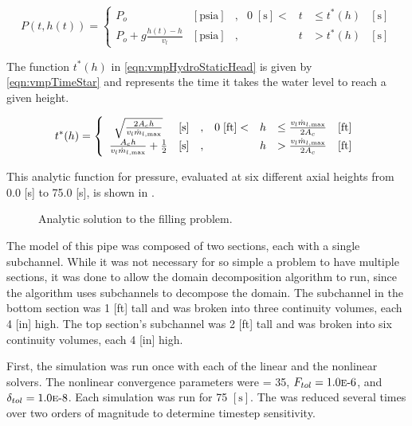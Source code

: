\begin{equation}
\label{eqn:vmpHydroStaticHead}
P(t, h(t))= 
 \left\{
\begin{array}{cclrcll}
P_o & [ \text{psia} ] & , & 0\; [\text{s}] < & t & \leq t^{*}(h) & [\text{s}] \\
P_o + g \frac{ h(t) - h }{ v_{l} } & [ \text{psia} ] & , &  & t & > t^{*}(h) & [\text{s}]
\end{array}\right.
\end{equation}

The function $t^{*}(h)$ in \eqref{eqn:vmpHydroStaticHead} is given by \eqref{eqn:vmpTimeStar} and represents the time it takes the water level to reach a given height.

\begin{equation}
\label{eqn:vmpTimeStar}
t^{*}(h)= 
 \left\{
\begin{array}{cclrcll}
\sqrt{\frac{2 A_c h}{v_{l} \dot{m}_{l,\text{max}}}} & [ \text{s} ] & , & 0\; [ \text{ft}] < & h & \leq \frac{v_l \dot{m}_{l,\text{max}}}{2 A_c} & [\text{ft}] \\
\frac{ A_c h }{v_{l} \dot{m}_{l,\text{max}}} + \onehalf & [ \text{s} ] & , &                & h & > \frac{v_l \dot{m}_{l,\text{max}}}{2 A_c} & [\text{ft}]
\end{array}\right.
\end{equation}

This analytic function for pressure, evaluated at six different axial heights from 0.0 [s] to 75.0 [s], is shown in .

\begin{figure}[h!tb]
\centering

\caption{Analytic solution to the filling problem.}
\label{fig:vmpAnalyticSol}
\end{figure}

The model of this pipe was composed of two sections, each with a single subchannel.
While it was not necessary for so simple a problem to have multiple sections, it was done to allow the domain decomposition algorithm to run, since the algorithm uses subchannels to decompose the domain.
The subchannel in the bottom section was 1 [ft] tall and was broken into three continuity volumes, each 4 [in] high.
The top section's subchannel was 2 [ft] tall and was broken into six continuity volumes, each 4 [in] high.

First, the simulation was run once with each of the linear and the nonlinear solvers.
The nonlinear convergence parameters were \kmax{} = 35, $F_{tol} = \expneg{1.0}{6}$, and $\delta_{tol} = \expneg{1.0}{8}$. 
Each simulation was run for 75 $[ \text{s} ]$.
The \dtmax{} was reduced several times over two orders of magnitude to determine timestep sensitivity.

